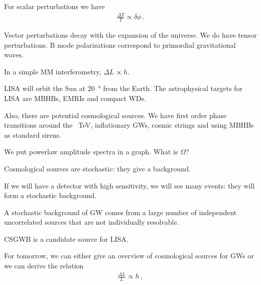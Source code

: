 \documentclass[main.tex]{subfiles}
\begin{document}
For scalar perturbations we have 
%
\begin{align}
\frac{\Delta T}{T} \propto \delta \phi 
\,.
\end{align}

Vector perturbations decay with the expansion of the universe. We do have tensor perturbations.  B mode polarizations correspond to primordial gravitational waves. 


In a simple MM interferometry, \(\Delta L \propto h\). 

LISA will orbit the Sun at \SI{20}{\degree} from the Earth. 
The astrophysical targets for LISA are MBHBs, EMRIs and compact WDs. 

Also, there are potential cosmological sources. We have first order phase transitions around the \SI{}{TeV}, inflationary GWs, cosmic strings and using MBHBs as standard sirens. 

We put powerlaw amplitude spectra in a graph. What is \(\Omega \)? 

Cosmological sources are stochastic: they give a background. 

If we will have a detector with high sensitivity, we will see many events: they will form a stochastic background. 


A stochastic background of GW comes from a large number of independent uncorrelated sources that are not individually resolvable.

CSGWB is a candidate source for LISA. 

For tomorrow, we can either give an overview of cosmological sources for GWs or we can derive the relation 
%
\begin{align}
\frac{\Delta L}{L} \propto h
\,,
\end{align}
\end{document}
